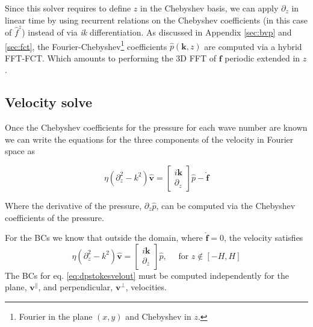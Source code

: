 \documentclass[ twoside,openright,titlepage,numbers=noenddot,%
headinclude,footinclude,cleardoublepage=empty,abstract=on,
BCOR=5mm,paper=a4,fontsize=11pt, dvipsnames
]{scrreprt}
\renewcommand{\vec}[1]{\bm{#1}}
\newcommand{\fou}[1]{\widehat{#1}}
\newcommand{\fvel}{v}
\begin{document}
Since this solver requires to define $z$ in the Chebyshev basis, we can apply $\partial_z$ in linear time by using recurrent relations on the Chebyshev coefficients (in this case of $\fou{f}^z$) instead of via \emph{ik} differentiation. As discussed in Appendix \ref{sec:bvp} and \ref{sec:fct}, the Fourier-Chebyshev\footnote{Fourier in the plane $(x,y)$ and Chebyshev in $z$.} coefficients $\fou{p}(\vec{k}, z)$ are computed via a hybrid \gls{FFT}-\gls{FCT}. Which amounts to performing the 3D \gls{FFT} of $\vec{f}$ periodic extended in $z$.

\subsection*{Velocity solve}
Once the Chebyshev coefficients for the pressure for each wave number are known we can write the equations for the three components of the velocity in Fourier space as

\begin{equation}
  \label{eq:dpstokesvel}
  \eta\left(\partial^2_{z} -k^2\right)\fou{\vec{\fvel}} = 
  \begin{bmatrix}
    i\vec{k}\\
    \partial_z
  \end{bmatrix}
  \fou{p} -\fou{\vec{f}}
\end{equation}

Where the derivative of the pressure, $\partial_z\fou{p}$, can be computed via the Chebyshev coefficients of the pressure.

For the \glspl{BC} we know that outside the domain, where $\fou{\vec{f}} = 0$, the velocity satisfies
\begin{equation}
  \label{eq:dpstokesvelout}
  \eta\left(\partial^2_{z} -k^2\right)\fou{\vec{\fvel}} = 
  \begin{bmatrix}
    i\vec{k}\\
    \partial_z
  \end{bmatrix}
  \fou{p}, \quad \text{ for } z \notin [-H,H]
\end{equation}
The \glspl{BC} for eq. \eqref{eq:dpstokesvelout} must be computed independently for the plane, $\vec{\fvel}^\parallel$, and perpendicular, $\vec{\fvel}^\perp$, velocities.
\end{document}
